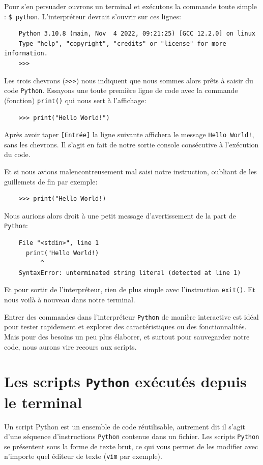 Pour s'en persuader ouvrons un terminal et exécutons la commande toute simple : \verb|$ python|. L'interpréteur devrait s'ouvrir sur ces lignes:
\begin{verbatim}
    Python 3.10.8 (main, Nov  4 2022, 09:21:25) [GCC 12.2.0] on linux
    Type "help", "copyright", "credits" or "license" for more information.
    >>> 
\end{verbatim}
\medskip

Les trois chevrons (\verb|>>>|) nous indiquent que nous sommes alors prêts à saisir du code \texttt{Python}. Essayons une toute première ligne de code avec la commande (fonction) \texttt{print()} qui nous sert à l'affichage:
\begin{verbatim}
    >>> print("Hello World!")
\end{verbatim}
\medskip

Après avoir taper \texttt{[Entrée]} la ligne suivante affichera le message \texttt{Hello World!}, sans les chevrons. Il s'agit en fait de notre sortie console consécutive à l'exécution du code.
\medskip

Et si nous avions malencontreusement mal saisi notre instruction, oubliant de les guillemets de fin par exemple:
\begin{verbatim}
    >>> print("Hello World!)
\end{verbatim}
\medskip

Nous aurions alors droit à une petit message d'avertissement de la part de \texttt{Python}:
\begin{verbatim}
    File "<stdin>", line 1
      print("Hello World!)
          ^
    SyntaxError: unterminated string literal (detected at line 1)
\end{verbatim}

Et pour sortir de l'interpréteur, rien de plus simple avec l'instruction \texttt{exit()}. Et nous voilà à nouveau dans notre terminal.
\medskip

Entrer des commandes dans l'interpréteur \texttt{Python} de manière interactive est idéal pour tester rapidement et explorer des caractéristiques ou des fonctionnalités. Mais pour des besoins un peu plus élaborer, et surtout pour sauvegarder notre code, nous aurons vire recours aux scripts.
\medskip

\section{Les scripts \texttt{Python} exécutés depuis le terminal}
Un script Python est un ensemble de code réutilisable, autrement dit il s'agit d'une séquence d'instructions \texttt{Python} contenue dans un fichier. Les scripts \texttt{Python} se présentent sous la forme de texte brut, ce qui vous permet de les modifier avec n'importe quel éditeur de texte (\texttt{vim} par exemple).
\medskip

